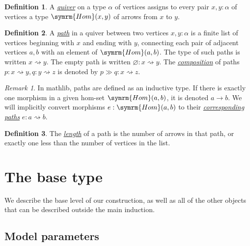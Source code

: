 \documentclass{article}
\newcommand{\mdef}[3]{\href{https://leanprover-community.github.io/mathlib4\_docs/Mathlib/#1.html\##2}{\emph{#3}}}
\theoremstyle{definition}
\newtheorem{definition}{Definition}[section]
\theoremstyle{remark}
\newtheorem*{remark}{Remark}
\begin{document}
\begin{definition}
    A \mdef{Combinatorics/Quiver/Basic}{Quiver}{quiver} on a type \( \alpha \) of vertices assigns to every pair \( x, y : \alpha \) of vertices a type \( \symrm{Hom}(x, y) \) of arrows from \( x \) to \( y \).
\end{definition}
\begin{definition}
    A \mdef{Combinatorics/Quiver/Path}{Quiver.Path}{path} in a quiver between two vertices \( x, y : \alpha \) is a finite list of vertices beginning with \( x \) and ending with \( y \), connecting each pair of adjacent vertices \( a, b \) with an element of \( \symrm{Hom}(a, b) \).
    The type of such paths is written \( x \rightsquigarrow y \).
    The empty path is written \( \varnothing : x \rightsquigarrow y \).
    The \mdef{Combinatorics/Quiver/Path}{Quiver.Path.comp}{composition} of paths \( p : x \rightsquigarrow y, q : y \rightsquigarrow z \) is denoted by \( p \gg q : x \rightsquigarrow z \).
\end{definition}
\begin{remark}
    In mathlib, paths are defined as an inductive type.
    If there is exactly one morphism in a given hom-set \( \symrm{Hom}(a, b) \), it is denoted \( a \to b \).
    We will implicitly convert morphisms \( e : \symrm{Hom}(a, b) \) to their \mdef{Combinatorics/Quiver/Path}{Quiver.Hom.toPath}{corresponding paths} \( e : a \rightsquigarrow b \).
\end{remark}
\begin{definition}
    The \mdef{Combinatorics/Quiver/Path}{Quiver.Path.length}{length} of a path is the number of arrows in that path, or exactly one less than the number of vertices in the list.
\end{definition}

\section{The base type}

We describe the base level of our construction, as well as all of the other objects that can be described outside the main induction.

\subsection{Model parameters}
\end{document}
